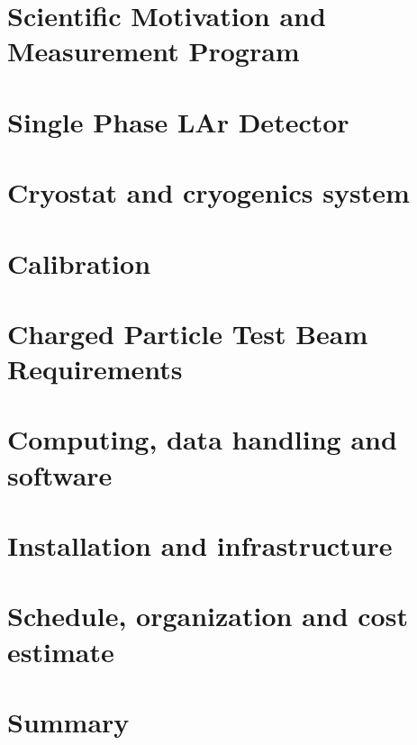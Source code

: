 \documentclass[12pt]{article}
\begin{document}
\section{Scientific Motivation and Measurement Program} %
	
	

\section{Single Phase LAr Detector} 

	


\section{Cryostat and cryogenics system} %
	
	
\section{Calibration}
	

\section{Charged Particle Test Beam Requirements} %
	


\section{Computing, data handling and software} %
	

\section{Installation and infrastructure}  %
	
	
	
\section{Schedule, organization and cost estimate} %
	

\section{Summary}  %
	



\end{document}
